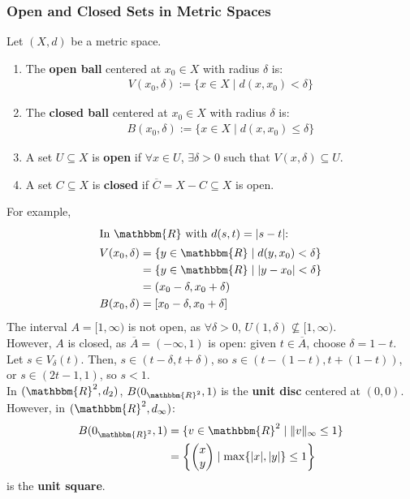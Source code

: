 \documentclass[10pt]{extarticle}
\newcommand{\R}{\mathbbm{R}}
\begin{document}
    \subsubsection{Open and Closed Sets in Metric Spaces}%
    Let $(X,d)$ be a metric space.
    \begin{enumerate}[(1)]
      \item The \textbf{open ball} centered at $x_0\in X$ with radius $\delta$ is:
        \begin{align*}
        V(x_0,\delta) := \{x\in X \mid d(x,x_0) < \delta\}
        \end{align*}
      \item The \textbf{closed ball} centered at $x_0\in X$  with radius $\delta$ is:
        \begin{align*}
          B(x_0,\delta) := \{x\in X \mid d(x,x_0) \leq \delta\}
        \end{align*}
      \item A set $U\subseteq X$ is \textbf{open} if $\forall x\in U$, $\exists \delta > 0$ such that $V(x,\delta)\subseteq U$.
      \item A set $C\subseteq X$ is \textbf{closed} if $\overline{C} = X-C\subseteq X$ is open.
    \end{enumerate}
    For example, 
      \begin{align*}
        \shortintertext{In $\R$ with $d(s,t) = |s-t|$:}
        V(x_0,\delta) &= \{y\in\R \mid d(y,x_0) < \delta\}\\
                      &= \{y\in\R \mid |y-x_0| < \delta\}\\
                      &= (x_0-\delta,x_0+\delta)\\
        B(x_0,\delta) &= [x_0-\delta,x_0+\delta]
      \end{align*}
      The interval $A = [1,\infty)$ is not open, as $\forall \delta > 0$, $U(1,\delta)\not\subseteq [1,\infty)$.\\

      However, $A$ is closed, as $\overline{A} = (-\infty,1)$ is open: given $t\in \overline{A}$, choose $\delta = 1-t$. Let $s\in V_{\delta}(t)$. Then, $s\in (t-\delta, t+\delta)$, so $s\in (t-(1-t),t + (1-t))$, or $s\in(2t-1,1)$, so $s < 1$.\\

    In $(\R^2,d_2)$, $B(0_{\R^2},1)$ is the \textbf{unit disc} centered at $(0,0)$.\\

    However, in $(\R^2,d_{\infty})$:
    \begin{align*}
      B(0_{\R^2},1) &= \{v\in\R^2 \mid \Vert v \Vert_{\infty} \leq 1\}\\
                    &= \left\{\begin{pmatrix}x\\y\end{pmatrix}\mid \max\{|x|,|y|\}\leq 1\right\}
    \end{align*}
    is the \textbf{unit square}.
\end{document}

